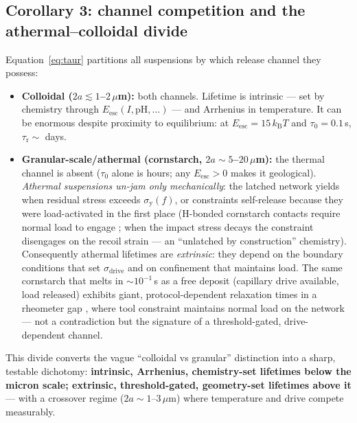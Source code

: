 \documentclass[11pt]{article}
\begin{document}
\subsection{Corollary 3: channel competition and the athermal--colloidal divide}
\label{sec:channels}
Equation~\eqref{eq:taur} partitions all suspensions by which release channel they possess:
\begin{itemize}
\item \textbf{Colloidal ($2a \lesssim 1$--$2\,\mu$m):} both channels. Lifetime is intrinsic --- set by chemistry through $E_{\mathrm{esc}}(I,\mathrm{pH},\ldots)$ --- and Arrhenius in temperature. It can be enormous despite proximity to equilibrium: at $E_{\mathrm{esc}} = 15\,k_{\mathrm{B}}T$ and $\tau_0 = 0.1$\,s, $\tau_{\mathrm{r}} \sim$ days.
\item \textbf{Granular-scale/athermal (cornstarch, $2a \sim 5$--$20\,\mu$m):} the thermal channel is absent ($\tau_{0}$ alone is hours; any $E_{\mathrm{esc}} > 0$ makes it geological). \emph{Athermal suspensions un-jam only mechanically}: the latched network yields when residual stress exceeds $\sigma_{\mathrm{y}}(f)$, or constraints self-release because they were load-activated in the first place (H-bonded cornstarch contacts require normal load to engage \cite{james2018}; when the impact stress decays the constraint disengages on the recoil strain --- an ``unlatched by construction'' chemistry). Consequently athermal lifetimes are \emph{extrinsic}: they depend on the boundary conditions that set $\sigma_{\mathrm{drive}}$ and on confinement that maintains load. The same cornstarch that melts in $\sim 10^{-1}$\,s as a free deposit (capillary drive available, load released) exhibits giant, protocol-dependent relaxation times in a rheometer gap \cite{maharjan2017}, where tool constraint maintains normal load on the network --- not a contradiction but the signature of a threshold-gated, drive-dependent channel.
\end{itemize}
This divide converts the vague ``colloidal vs granular'' distinction into a sharp, testable dichotomy: \textbf{intrinsic, Arrhenius, chemistry-set lifetimes below the micron scale; extrinsic, threshold-gated, geometry-set lifetimes above it} --- with a crossover regime ($2a \sim 1$--$3\,\mu$m) where temperature and drive compete measurably.
\end{document}
